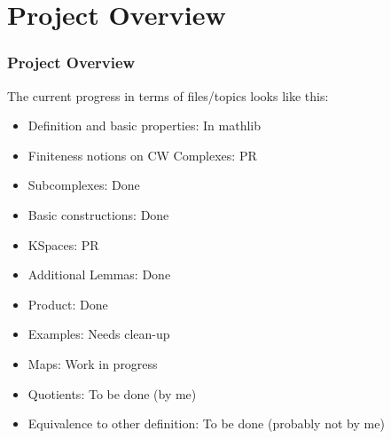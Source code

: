 \documentclass{beamer}
\begin{document}
\section{Project Overview}

\begin{frame}
  \frametitle{Project Overview}
  \fontsize{10pt}{5}\selectfont
  The current progress in terms of files/topics looks like this:
  \begin{itemize}
    \item[\textcolor{Green}{\textbullet}] Definition and basic properties: In mathlib
    \item[\textcolor{Yellow}{\textbullet}] Finiteness notions on CW Complexes: PR
    \item[\textcolor{YellowOrange}{\textbullet}] Subcomplexes: Done
    \item[\textcolor{YellowOrange}{\textbullet}] Basic constructions: Done 
    \item[\textcolor{Yellow}{\textbullet}] KSpaces: PR
    \item[\textcolor{YellowOrange}{\textbullet}] Additional Lemmas: Done
    \item[\textcolor{YellowOrange}{\textbullet}] Product: Done
    \item[\textcolor{Orange}{\textbullet}] Examples: Needs clean-up
    \item[\textcolor{Orange}{\textbullet}] Maps: Work in progress
    \item[\textcolor{Red}{\textbullet}] Quotients: To be done (by me)
    \item[\textcolor{BrickRed}{\textbullet}] Equivalence to other definition: To be done (probably not by me)
  \end{itemize}
\end{frame}
\end{document}

